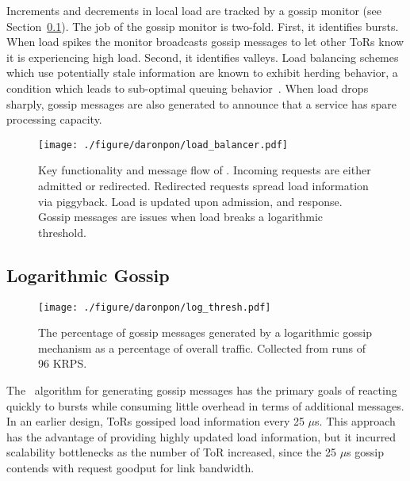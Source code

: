 Increments and decrements in local load are tracked by a gossip monitor (see
Section~\ref{subsec:gossip}). The job of the gossip monitor is two-fold. First,
it identifies bursts. When load spikes the monitor broadcasts gossip messages
to let other ToRs know it is experiencing high load. Second, it identifies
valleys. Load balancing schemes which use potentially stale information are
known to exhibit herding behavior, a condition which leads to sub-optimal
queuing behavior~\cite{dahlin_stale_info,mitzenmacher_old_info}. When load
drops sharply, gossip messages are also generated to announce that a service
has spare processing capacity.

\begin{figure}[t]
  \centering
    \texttt{[image: ./figure/daronpon/load\_balancer.pdf]}
    \centering

    \caption{ %
        Key functionality and message flow of \toolname.
        Incoming requests are either admitted or redirected.
        Redirected requests spread load information via piggyback.
        Load is updated upon admission, and response.  Gossip messages
        are issues when load breaks a logarithmic threshold.}

  \label{fig:load_balancer}
\end{figure}

\subsection{Logarithmic Gossip}
\label{subsec:gossip}

\begin{figure}[t]
  \centering
    \texttt{[image: ./figure/daronpon/log\_thresh.pdf]}
    \centering
    \caption{The percentage of gossip messages generated by a
    logarithmic gossip mechanism as a percentage of overall traffic.
    Collected from runs of 96 KRPS.} 
  \label{fig:log_thresh}
\end{figure}

The \systemname\ algorithm for generating gossip messages has the primary goals
of reacting quickly to bursts while consuming little overhead in terms of
additional messages.  In an earlier design, ToRs gossiped load information every
25 $\mu$s. This approach has the advantage of providing highly updated load
information, but it incurred scalability bottlenecks as the number of ToR
increased, since the 25 $\mu$s gossip contends with request goodput for link
bandwidth.

